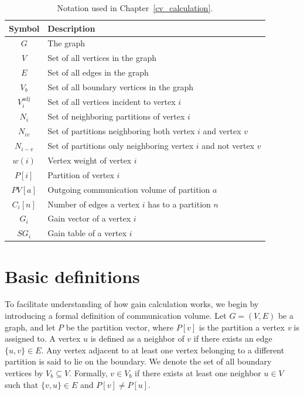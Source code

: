 \begin{table}[h]
	\label{tab:notation}
	\begin{tabular}{cl}
		\toprule
		\textbf{Symbol} & \textbf{Description} \\
		\midrule
		$G$          & The graph \\
		$V$			& Set of all vertices in the graph\\
		$E$			& Set of all edges in the graph\\
		$V_b$		& Set of all boundary vertices in the graph\\
		$V^{\mathrm{adj}}_i$ & Set of all vertices incident to vertex $i$\\
		$N_i$        & Set of neighboring partitions of vertex $i$ \\
		$N_{iv}$      & Set of partitions neighboring both vertex $i$ and  vertex $v$\\
		$N_{i-v}$    & Set of partitions only neighboring vertex $i$ and not vertex $v$\\
		$w(i)$		& Vertex weight of vertex $i$\\
		$P[i]$		& Partition of vertex $i$\\
		$PV[a]$		& Outgoing communication volume of partition $a$\\
		$C_i[n]$	& Number of edges a vertex $i$ has to a partition $n$\\
		$G_i$		& Gain vector of a vertex $i$\\
		$SG_i$		& Gain table of a vertex $i$\\	
		\bottomrule
	\end{tabular}
	\caption{Notation used in Chapter~\ref{cv_calculation}.}
\end{table}
\section{Basic definitions}
To facilitate understanding of how gain calculation works, we begin by introducing a formal definition of communication volume. Let $G = (V, E)$ be a graph, and let $P$ be the partition vector, where $P[v]$ is the partition a vertex \textit{v} is assigned to. A vertex $u$ is defined as a neighbor of $v$ if there exists an edge $\{u,v\} \in E$. Any vertex adjacent to at least one vertex belonging to a different partition is said to lie on the boundary. We denote the set of all boundary vertices by $V_b \subseteq V$. Formally, $v \in V_b$ if there exists at least one neighbor $u \in V$ such that $\{v,u\} \in E$ and $P[v] \neq P[u]$.

